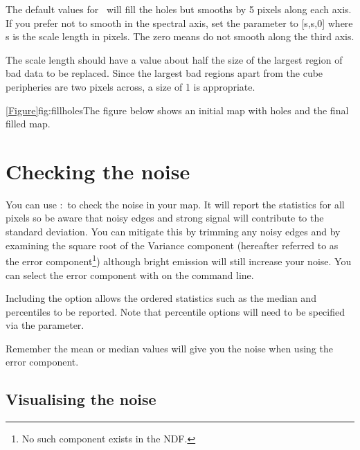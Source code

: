 \documentclass[11pt,oneside,chapters]{starlink}
\begin{document}
The default values for \fillbad\ will fill the holes but smooths by 5
pixels along each axis. If you prefer not to smooth in the spectral
axis, set the parameter  to [s,s,0] where s is the scale
length in pixels.  The zero means do not smooth along the third axis.

The scale length should have a value about half the size of the
largest region of bad data to be replaced.  Since the largest bad
regions apart from the cube peripheries are two pixels across, a size
of 1 is appropriate.
\begin{terminalv}
\end{terminalv}
\cref{Figure}{fig:fillholes}{The figure below} shows an initial map
with holes and the final filled map.



\section{Checking the noise}
\label{sec:noise}

You can use \Kappa:\stats\ to check the noise in your map. It will
report the statistics for all pixels so be aware that noisy edges and
strong signal will contribute to the standard deviation. You can
mitigate this by trimming any noisy edges and by examining the square
root of the Variance component (hereafter referred to as the error
component\footnote{No such component exists in the NDF.}) although
bright emission will still increase your noise. You can select the
error component with  on the command line.
\begin{terminalv}
\end{terminalv}
Including the option  allows the ordered statistics such
as the median and percentiles to be reported. Note that percentile
options will need to be specified via the 
parameter.

\begin{tip}
Remember the mean or median values will give you the noise when
using the error component.
\end{tip}

\subsection{Visualising the noise}
\end{document}
